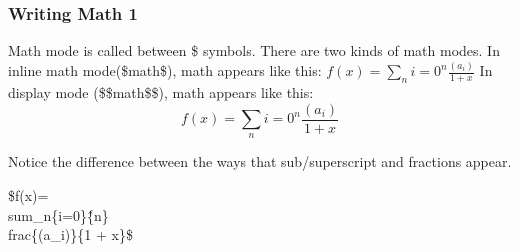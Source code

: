 \documentclass{beamer}
\begin{document}
\begin{frame}
	\frametitle{Writing Math 1}
	
	Math mode is called between \$ symbols. There are two kinds of math modes. In inline math mode(\$math\$), math appears like this: $f(x)= \sum_n{i=0}^{n} \frac{(a_i)}{1 + x}$ In display mode (\$\$math\$\$), math appears like this: 	$$f(x)= \sum_n{i=0}^{n} \frac{(a_i)}{1 + x}$$
	
	Notice the difference between the ways that sub/superscript and fractions appear.
	\begin{semiverbatim}
			\$f(x)= \\sum\_n\{i=0\}\^\{n\} \\frac\{(a\_i)\}\{1 + x\}\$
	\end{semiverbatim}
\end{frame}	
\end{document}
